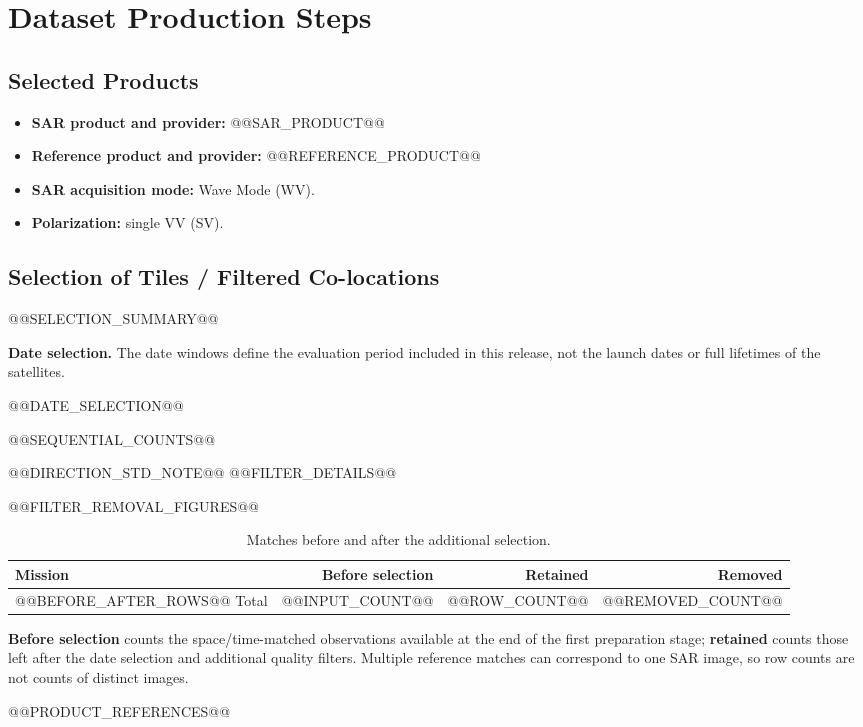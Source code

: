 \documentclass[11pt,a4paper]{article}
\begin{document}
\section{Dataset Production Steps}
\subsection{Selected Products}
\begin{itemize}
    \item \textbf{SAR product and provider:} @@SAR_PRODUCT@@
    \item \textbf{Reference product and provider:} @@REFERENCE_PRODUCT@@
    \item \textbf{SAR acquisition mode:} Wave Mode (WV).
    \item \textbf{Polarization:} single VV (SV).
\end{itemize}

\subsection{Selection of Tiles / Filtered Co-locations}
@@SELECTION_SUMMARY@@

\textbf{Date selection.} The date windows define the evaluation period included in this release, not the launch dates or full lifetimes of the satellites.
\begin{itemize}
@@DATE_SELECTION@@
\end{itemize}

@@SEQUENTIAL_COUNTS@@

@@DIRECTION_STD_NOTE@@
@@FILTER_DETAILS@@

@@FILTER_REMOVAL_FIGURES@@

\begin{table}[H]
    \centering
    \caption{Matches before and after the additional selection.}
    \label{tab:selection_summary}
    \begin{tabular}{lrrr}
        \toprule
        \textbf{Mission} & \textbf{Before selection} & \textbf{Retained} & \textbf{Removed} \\
        \midrule
@@BEFORE_AFTER_ROWS@@
        \midrule
        Total & @@INPUT_COUNT@@ & @@ROW_COUNT@@ & @@REMOVED_COUNT@@ \\
        \bottomrule
    \end{tabular}
\end{table}
\textbf{Before selection} counts the space/time-matched observations available at the end of the first preparation stage; \textbf{retained} counts those left after the date selection and additional quality filters. Multiple reference matches can correspond to one SAR image, so row counts are not counts of distinct images.

\newpage
{}

\begin{thebibliography}{9}
@@PRODUCT_REFERENCES@@
\end{thebibliography}
\end{document}
